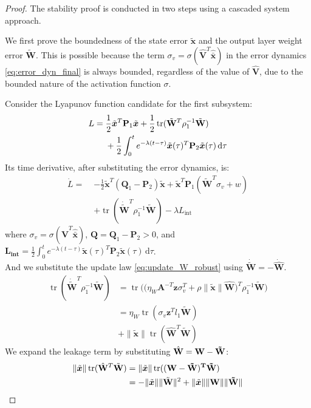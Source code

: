\documentclass[10pt,twocolumn]{ICCAS}
\newcommand{\tr}{\operatorname{tr}}
\newcommand{\ud}{\,\mathrm{d}}
\newcommand{\xtilde}{\tilde{\bm{x}}}
\newcommand{\xhatbar}{\hat{\bar{\bm{x}}}}
\newcommand{\Wtilde}{\tilde{\mathbf{W}}}
\newcommand{\What}{\hat{\mathbf{W}}}
\newcommand{\Vhat}{\hat{\mathbf{V}}}
\begin{document}
\begin{proof}
The stability proof is conducted in two steps using a cascaded system approach.


We first prove the boundedness of the state error $\xtilde$ and the output layer weight error $\Wtilde$. This is possible because the term $\sigma_v = \sigma(\Vhat^T \xhatbar)$ in the error dynamics \eqref{eq:error_dyn_final} is always bounded, regardless of the value of $\Vhat$, due to the bounded nature of the activation function $\sigma$.

Consider the Lyapunov function candidate for the first subsystem:
\begin{align}
    L =\; & \frac{1}{2}\xtilde^T {\mathbf{P}_1} \xtilde \notag + \frac{1}{2}\tr(\Wtilde^T \rho_1^{-1}\Wtilde) \notag \\
    & + \frac{1}{2} \int_{0}^{t} e^{-\lambda(t-\tau)} \xtilde(\tau)^T {\mathbf{P}_2} \xtilde(\tau) \ud\tau
\end{align}
Its time derivative, after substituting the error dynamics, is:
\begin{align*}
    \dot{L} =\; & -\frac{1}{2}\xtilde^T({\mathbf{Q}_1} - {\mathbf{P}_2}) \xtilde + \xtilde^T\mathbf{P}_1 (\Wtilde^T \sigma_v + w) \\
    &+ \tr(\dot{\Wtilde}^T\rho_1^{-1} \Wtilde) - \lambda L_{\text{int}}
\end{align*}
where $\sigma_v = \sigma(\Vhat^T\xhatbar)$, $\mathbf{Q} = \mathbf{Q}_1 - \mathbf{P}_2 > 0$, and $\bm{L_{\text{int}}} = \frac{1}{2} \int_{0}^{t} e^{-\lambda(t-\tau)} \xtilde(\tau)^T {\mathbf{P}_2} \xtilde(\tau) \ud\tau$.\\
And we substitute the update law \eqref{eq:update_W_robust} using $\dot{\Wtilde} = -\dot{\What}$. 
\begin{align*}
    \tr(\dot{\Wtilde}^T \rho_1^{-1}\Wtilde) 
    &= \tr\Big( \big(\eta_W {\mathbf{A}}^{-T}\bm{z}\sigma_v^T + \rho \|\xtilde\| \What\big)^T \rho_1^{-1}\Wtilde \Big) \\
    &= {\eta_W}\tr(\sigma_v \bm{z}^T l_1 \Wtilde)\\
    &+ \|\xtilde\| \tr(\What^T \Wtilde)
\end{align*}
We expand the leakage term by substituting $\What =\bf{W} - \Wtilde$:
\begin{align*}
    \|\xtilde\| \tr(\What^T\Wtilde) &= \|\xtilde\| \tr((\bf{W} - \Wtilde)^T\Wtilde)\\&= -\|\xtilde\| \|\Wtilde\|^{2}+\|\xtilde\| \|\bf{W}\|\|\Wtilde\|

\end{align*}
\end{proof}
\end{document}
